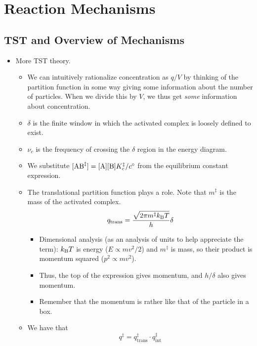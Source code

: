 \documentclass[../notes.tex]{subfiles}
\begin{document}
\chapter{Reaction Mechanisms}
\section{TST and Overview of Mechanisms}
\begin{itemize}
    \item {}More TST theory.
    \begin{itemize}
        \item We can intuitively rationalize concentration as $q/V$ by thinking of the partition function in some way giving some information about the number of particles. When we divide this by $V$, we thus get \emph{some} information about concentration.
        \item $\delta$ is the finite window in which the activated complex is loosely defined to exist.
        \item $\nu_c$ is the frequency of crossing the $\delta$ region in the energy diagram.
        \item We substitute $[\ce{AB}^\ddagger]=[\ce{A}][\ce{B}]K_c^\ddagger/c^\circ$ from the equilibrium constant expression.
        \item The translational partition function plays a role. Note that $m^\ddagger$ is the mass of the activated complex.
        \begin{equation*}
            q_\text{trans} = \frac{\sqrt{2\pi m^\ddagger k_\text{B} T}}{h}\delta
        \end{equation*}
        \begin{itemize}
            \item Dimensional analysis (as an analysis of units to help appreciate the term): $k_\text{B} T$ is energy ($E\propto mv^2/2$) and $m^\ddagger$ is mass, so their product is momentum squared ($p^2\propto mv^2$).
            \item Thus, the top of the expression gives momentum, and $h/\delta$ also gives momentum.
            \item Remember that the momentum is rather like that of the particle in a box.
        \end{itemize}
        \item We have that
        \begin{equation*}
            q^\ddagger = q_\text{trans}^\ddagger\cdot q_\text{int}^\ddagger
        \end{equation*}

\end{itemize}
\end{itemize}
\end{document}
